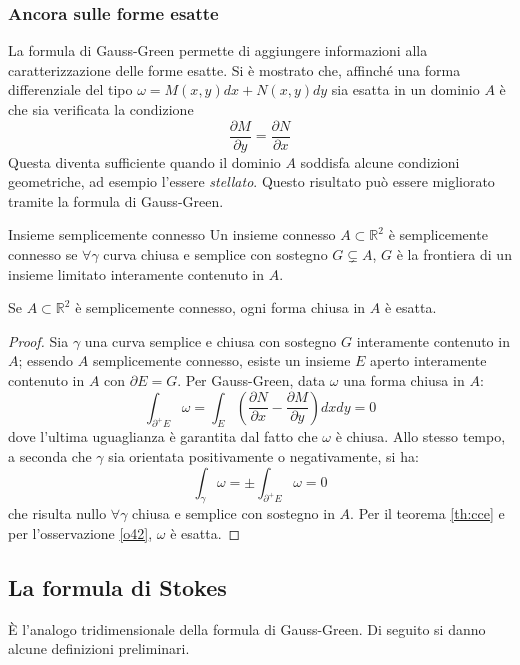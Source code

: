 \documentclass[11pt, a4paper]{scrartcl}
\theoremstyle{definition}
\numberwithin{esempio}{section}
\theoremstyle{definition}
\numberwithin{obs}{section}
\numberwithin{nota}{section}
\numberwithin{equation}{subsection}
\begin{document}
\subsubsection{Ancora sulle forme esatte}
La formula di Gauss-Green permette di aggiungere informazioni alla caratterizzazione delle forme esatte.
Si \`e mostrato che, affinch\'e una forma differenziale del tipo $\omega = M(x,y) dx+ N(x,y)  dy $ sia esatta in un dominio $A$ \`e che sia verificata la condizione
\[
\frac{\partial M}{\partial y}  = \frac{\partial N}{\partial x} 
\] 
Questa diventa sufficiente quando il dominio $A$ soddisfa alcune condizioni geometriche, ad esempio l'essere \textit{stellato}. 
Questo risultato pu\`o essere migliorato tramite la formula di Gauss-Green.
\begin{definizione}
	{Insieme semplicemente connesso}{}
	Un insieme connesso $A \subset \mathbb{R}^{2} $ \`e semplicemente connesso se $\forall \gamma$ curva chiusa e semplice con sostegno $G \subsetneq A$, $G$ \`e la frontiera di un insieme limitato interamente contenuto in $A$.
\end{definizione}
\begin{teorema}
	{}{}
	Se $A \subset \mathbb{R}^2$ \`e semplicemente connesso, ogni forma chiusa in $A$ \`e esatta.
	\begin{proof}
		Sia $\gamma$ una curva semplice e chiusa con sostegno $G$ interamente contenuto in $A$; essendo $A$ semplicemente connesso, esiste un insieme $E $ aperto interamente contenuto in $A$ con $\partial E =  G$.
		Per Gauss-Green, data $\omega$ una forma chiusa in $A$:
		\[
		\int_{\partial ^+ E} \omega = \int_{E} \left(\frac{\partial N}{\partial x} - \frac{\partial M}{\partial y} \right) dxdy = 0
		\] 
		dove l'ultima uguaglianza \`e garantita dal fatto che $\omega $ \`e chiusa.
		Allo stesso tempo, a seconda che $\gamma$ sia orientata positivamente o negativamente, si ha:
		\[
		\int_{\gamma} \omega = \pm \int_{\partial ^+ E } \omega = 0
		\] 
		che risulta nullo $\forall \gamma$ chiusa e semplice con sostegno in $A$. 
		Per il teorema \ref{th:cce} e per l'osservazione \ref{o42}, $\omega $ \`e esatta.
	\end{proof}
\end{teorema}
\subsection{La formula di Stokes}

\`E l'analogo tridimensionale della formula di Gauss-Green. 
Di seguito si danno alcune definizioni preliminari.
\end{document}
